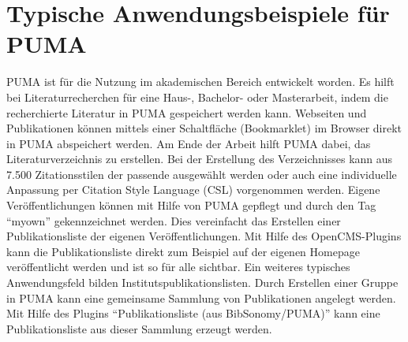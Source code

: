 \section{Typische Anwendungsbeispiele für PUMA}
\label{sec:typischeAnwendung}
PUMA ist für die Nutzung im akademischen Bereich entwickelt worden.
Es hilft bei Literaturrecherchen für eine Haus-, Bachelor- oder Masterarbeit, 
indem die recherchierte Literatur in PUMA gespeichert werden kann. Webseiten und 
Publikationen können mittels einer Schaltfläche (Bookmarklet) im Browser direkt 
in PUMA abspeichert werden. Am Ende der Arbeit hilft PUMA dabei, das 
Literaturverzeichnis zu erstellen. Bei der Erstellung des Verzeichnisses kann 
aus 7.500 Zitationsstilen der passende ausgewählt werden oder auch eine 
individuelle Anpassung per Citation Style Language (CSL) vorgenommen werden.
\newline 
Eigene Veröffentlichungen können mit Hilfe von PUMA gepflegt und  durch den Tag 
\enquote{myown} gekennzeichnet werden. Dies vereinfacht das Erstellen einer 
Publikationsliste der eigenen Veröffentlichungen. Mit Hilfe des 
OpenCMS-Plugins kann die Publikationsliste direkt zum Beispiel auf der eigenen 
Homepage veröffentlicht werden und ist so für alle sichtbar.
\newline 
Ein weiteres typisches Anwendungsfeld bilden Institutspublikationslisten. 
Durch Erstellen einer Gruppe in PUMA kann eine gemeinsame Sammlung von 
Publikationen angelegt werden. Mit Hilfe des Plugins 
\enquote{Publikationsliste (aus BibSonomy/PUMA)}  kann eine Publikationsliste aus dieser 
Sammlung erzeugt werden.

   
